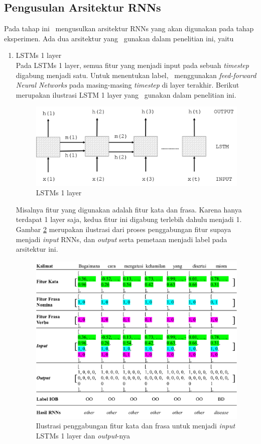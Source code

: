 \subsection{Pengusulan Arsitektur RNNs}
Pada tahap ini \saya~mengusulkan arsitektur RNNs yang akan digunakan pada tahap eksperimen. Ada dua arsitektur yang \saya~gunakan dalam penelitian ini, yaitu
\begin{enumerate}
	\item LSTMs 1 layer\\
	Pada LSTMs 1 layer, semua fitur yang menjadi input pada sebuah \textit{timestep} digabung menjadi satu. Untuk menentukan label, \saya~menggunakan \textit{feed-forward Neural Networks} pada masing-masing \textit{timestep} di layer terakhir. Berikut merupakan ilustrasi LSTM 1 layer yang \saya~gunakan dalam penelitian ini.
	
	\begin{figure}
		\centering
		\includegraphics[width=0.8\linewidth]{images/lstm1}
		\caption{LSTMs 1 layer}
		\label{fig:single_layer_rnn}
	\end{figure}

	Misalnya fitur yang digunakan adalah fitur kata dan frasa. Karena hanya terdapat 1 layer saja, kedua fitur ini digabung terlebih dahulu menjadi 1. Gambar \ref{fig:inputlstm} merupakan ilustrasi dari proses penggabungan fitur supaya menjadi \textit{input} RNNs, dan  \textit{output} serta pemetaan menjadi label pada arsitektur ini.
	\begin{figure}
		\centering
		\includegraphics[width=0.85\linewidth]{images/concatlstm1}
		\caption{Ilustrasi penggabungan fitur kata dan frasa untuk menjadi \textit{input} LSTMs 1 layer dan \textit{output}-nya}
		\label{fig:inputlstm}
	\end{figure}
	

\end{enumerate}
